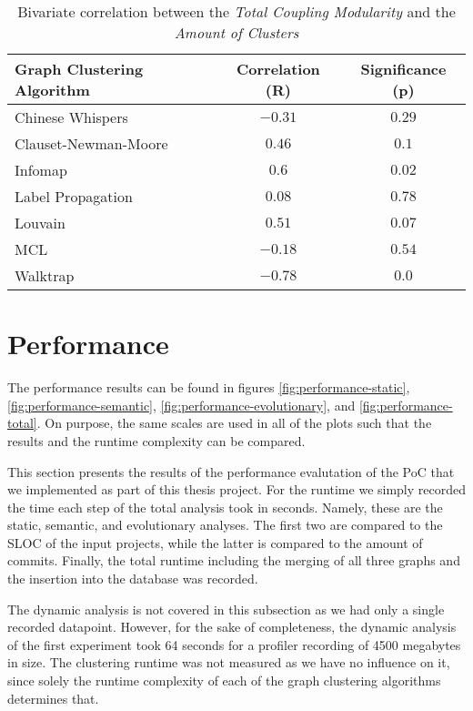 \documentclass[12pt,a4paper]{report}
\begin{document}
\begin{table}[ht!]
\def\arraystretch{1.55}
\begin{tabularx}{\textwidth}{|X|c|c|}
\hline
Graph Clustering Algorithm & Correlation (R) & Significance (p) \\
\hline\hline

Chinese Whispers      & $-0.31$ & $0.29$  \\\hline
Clauset-Newman-Moore  & $0.46$  & $0.1$   \\\hline
Infomap               & $0.6$   & $0.02$  \\\hline
Label Propagation     & $0.08$  & $0.78$  \\\hline
Louvain               & $0.51$  & $0.07$  \\\hline
MCL                   & $-0.18$ & $0.54$  \\\hline
Walktrap              & $-0.78$ & $0.0$   \\\hline

\end{tabularx}
\caption{Bivariate correlation between the \textit{Total Coupling Modularity} and the \textit{Amount of Clusters}}
\label{table:experiment-3.5}
\end{table}



\section{Performance}

The performance results can be found in figures \ref{fig:performance-static},
\ref{fig:performance-semantic}, \ref{fig:performance-evolutionary},
and \ref{fig:performance-total}. On purpose, the same scales are used in all
of the plots such that the results and the runtime complexity can be compared.

This section presents the results of the performance evalutation of
the PoC that we implemented as part of this thesis project.
For the runtime we simply recorded the time each step of the total analysis took
in seconds. Namely, these are the static, semantic, and evolutionary analyses.
The first two are compared to the SLOC of the input projects, while the latter
is compared to the amount of commits. Finally, the total runtime including
the merging of all three graphs and the insertion into the database was recorded.

The dynamic analysis is not covered in this subsection as we had only a single
recorded datapoint. However, for the sake of completeness, the dynamic analysis
of the first experiment took 64 seconds for a profiler recording of 4500 megabytes in size.
The clustering runtime was not measured as we have no influence on it,
since solely the runtime complexity of each of the graph clustering algorithms
determines that.
\end{document}
